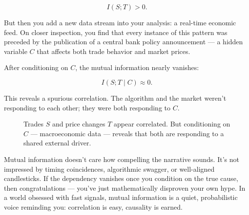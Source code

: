 \[
I(S; T) > 0.
\]

But then you add a new data stream into your analysis: a real-time economic feed. On closer inspection, you find that every instance of this pattern was preceded by the publication of a central bank policy announcement — a hidden variable \( C \) that affects both trade behavior and market prices.

After conditioning on \( C \), the mutual information nearly vanishes:

\[
I(S; T \mid C) \approx 0.
\]

This reveals a spurious correlation. The algorithm and the market weren’t responding to each other; they were both responding to \( C \).

\begin{figure}[H]
\centering
{}
\caption{Trades \( S \) and price changes \( T \) appear correlated. But conditioning on \( C \) — macroeconomic data — reveals that both are responding to a shared external driver.}
\end{figure}

\vspace{1em}
\noindent
Mutual information doesn’t care how compelling the narrative sounds. It’s not impressed by timing coincidences, algorithmic swagger, or well-aligned candlesticks. If the dependency vanishes once you condition on the true cause, then congratulations — you’ve just mathematically disproven your own hype. In a world obsessed with fast signals, mutual information is a quiet, probabilistic voice reminding you: correlation is easy, causality is earned.





